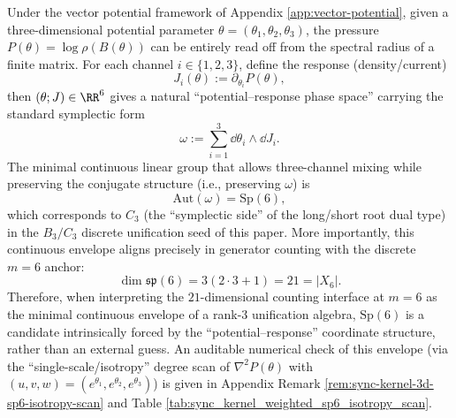 \begin{remark}[Three-channel potential--response symplectic phase space and the \texorpdfstring{$C_3=\mathrm{Sp}(6)$}{C3=Sp(6)} continuous envelope]\label{rem:sp6-minimal-continuous-envelope}
Under the vector potential framework of Appendix \ref{app:vector-potential}, given a three-dimensional potential parameter \(\theta=(\theta_1,\theta_2,\theta_3)\), the pressure
\(
P(\theta)=\log\rho(B(\theta))
\)
can be entirely read off from the spectral radius of a finite matrix.
For each channel \(i\in\{1,2,3\}\), define the response (density/current)
\[
J_i(\theta):=\partial_{\theta_i}P(\theta),
\]
then \((\theta;J)\in\RR^6\) gives a natural ``potential--response phase space'' carrying the standard symplectic form
\[
\omega:=\sum_{i=1}^{3}\dd\theta_i\wedge \dd J_i.
\]
The minimal continuous linear group that allows three-channel mixing while preserving the conjugate structure (i.e., preserving \(\omega\)) is
\[
\mathrm{Aut}(\omega)=\mathrm{Sp}(6),
\]
which corresponds to \(C_3\) (the ``symplectic side'' of the long/short root dual type) in the \(B_3/C_3\) discrete unification seed of this paper.
More importantly, this continuous envelope aligns precisely in generator counting with the discrete \(m=6\) anchor:
\[
\dim\mathfrak{sp}(6)=3(2\cdot 3+1)=21=|X_6|.
\]
Therefore, when interpreting the \(21\)-dimensional counting interface at \(m=6\) as the minimal continuous envelope of a rank-\(3\) unification algebra, \(\mathrm{Sp}(6)\) is a candidate intrinsically forced by the ``potential--response'' coordinate structure, rather than an external guess.
An auditable numerical check of this envelope (via the ``single-scale/isotropy'' degree scan of \(\nabla^2P(\theta)\) with \((u,v,w)=(e^{\theta_1},e^{\theta_2},e^{\theta_3})\)) is given in Appendix Remark \ref{rem:sync-kernel-3d-sp6-isotropy-scan} and Table \ref{tab:sync_kernel_weighted_sp6_isotropy_scan}.
\end{remark}

